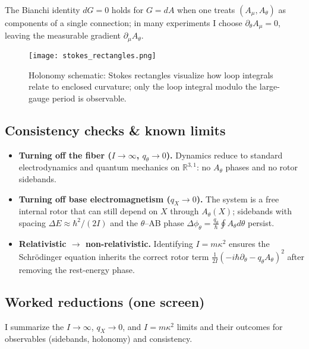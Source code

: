 The Bianchi identity $dG=0$ holds for $G=dA$ when one treats $(A_\mu, A_\theta)$ as components of a single connection; in many experiments I choose $\partial_\theta A_\mu=0$, leaving the measurable gradient $\partial_\mu A_\theta$.

\begin{figure}[h]
  \centering
  \texttt{[image: stokes\_rectangles.png]}
  \caption{Holonomy schematic: Stokes rectangles visualize how loop integrals relate to enclosed curvature; only the loop integral modulo the large-gauge period is observable.}
  \label{fig:stokes}
\end{figure}

\subsection{Consistency checks \& known limits}\label{sec:consistency-checks}
\begin{itemize}
  \item \textbf{Turning off the fiber ($I\to\infty$, $q_\theta\to 0$).} Dynamics reduce to standard electrodynamics and quantum mechanics on $\mathbb R^{3,1}$: no $A_\theta$ phases and no rotor sidebands.
  \item \textbf{Turning off base electromagnetism ($q_X\to 0$).} The system is a free internal rotor that can still depend on $X$ through $A_\theta(X)$; sidebands with spacing $\Delta E\approx \hbar^2/(2I)$ and the $\theta$--AB phase $\Delta\phi_\theta=\tfrac{q_\theta}{\hbar}\oint A_\theta d\theta$ persist.
  \item \textbf{Relativistic $\to$ non-relativistic.} Identifying $I=m\kappa^2$ ensures the Schr\"odinger equation inherits the correct rotor term $\tfrac{1}{2I}(-i\hbar\partial_\theta-q_\theta A_\theta)^2$ after removing the rest-energy phase.
\end{itemize}

\subsection{Worked reductions (one screen)}\label{sec:worked-reductions}
I summarize the $I\to\infty$, $q_X\to 0$, and $I=m\kappa^2$ limits and their outcomes for observables (sidebands, holonomy) and consistency.
